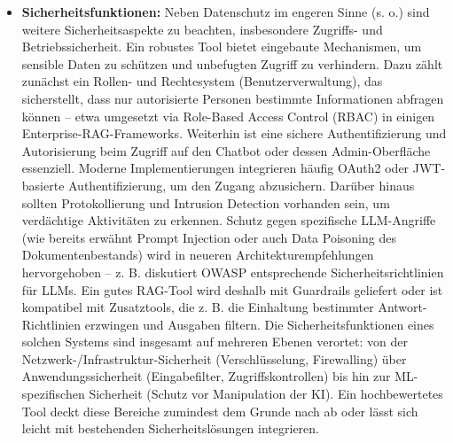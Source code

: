 \begin{itemize}
    \item \textbf{Sicherheitsfunktionen:} Neben Datenschutz im engeren Sinne (s. o.) sind weitere Sicherheitsaspekte zu beachten, insbesondere Zugriffs- und Betriebssicherheit. Ein robustes Tool bietet eingebaute Mechanismen, um sensible Daten zu schützen und unbefugten Zugriff zu verhindern. Dazu zählt zunächst ein Rollen- und Rechtesystem (Benutzerverwaltung), das sicherstellt, dass nur autorisierte Personen bestimmte Informationen abfragen können – etwa umgesetzt via Role-Based Access Control (RBAC) in einigen Enterprise-RAG-Frameworks. Weiterhin ist eine sichere Authentifizierung und Autorisierung beim Zugriff auf den Chatbot oder dessen Admin-Oberfläche essenziell. Moderne Implementierungen integrieren häufig OAuth2 oder JWT-basierte Authentifizierung, um den Zugang abzusichern. Darüber hinaus sollten Protokollierung und Intrusion Detection vorhanden sein, um verdächtige Aktivitäten zu erkennen. Schutz gegen spezifische LLM-Angriffe (wie bereits erwähnt Prompt Injection oder auch Data Poisoning des Dokumentenbestands) wird in neueren Architekturempfehlungen hervorgehoben – z. B. diskutiert OWASP entsprechende Sicherheitsrichtlinien für LLMs. Ein gutes RAG-Tool wird deshalb mit Guardrails geliefert oder ist kompatibel mit Zusatztools, die z. B. die Einhaltung bestimmter Antwort-Richtlinien erzwingen und Ausgaben filtern. Die Sicherheitsfunktionen eines solchen Systems sind insgesamt auf mehreren Ebenen verortet: von der Netzwerk-/Infrastruktur-Sicherheit (Verschlüsselung, Firewalling) über Anwendungssicherheit (Eingabefilter, Zugriffskontrollen) bis hin zur ML-spezifischen Sicherheit (Schutz vor Manipulation der KI). Ein hochbewertetes Tool deckt diese Bereiche zumindest dem Grunde nach ab oder lässt sich leicht mit bestehenden Sicherheitslösungen integrieren.

\end{itemize}
